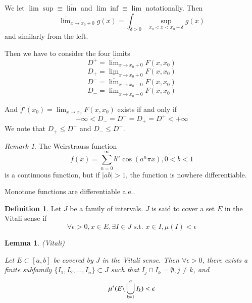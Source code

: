 \documentclass[11pt,a4paper]{report}
\newtheorem{lemma}[theorem]{Lemma}
\theoremstyle{plain}
\theoremstyle{definition}
\newtheorem*{defn}{Definition}
\theoremstyle{remark}
\newtheorem*{rem}{Remark}
\newcommand{\intersection}{\cap}
\newcommand{\Union}{\bigcup}
\newcommand{\abs}[1]{\left| #1 \right|}
\begin{document}
\renewcommand{\limsup}{\overline{\lim}}
\renewcommand{\liminf}{\underline{\lim}}

We let $\lim\sup \equiv \limsup$ and $\lim\inf \equiv \liminf$ notationally. Then
$$ \limsup_{x \to x_0 + 0} g(x) = \int_{\delta > 0} \sup_{x_0 < x < x_0 + \delta} g(x) $$
and similarly from the left.

Then we have to consider the four limits
\newcommand{\Dpu}{D^{+}}
\newcommand{\Dpl}{D_{+}}
\newcommand{\Dmu}{D^{-}}
\newcommand{\Dml}{D_{-}}
$$ \Dpu = \limsup_{x \to x_0 + 0} F(x, x_0) $$
$$ \Dpl = \liminf_{x \to x_0 + 0} F(x, x_0) $$
$$ \Dmu = \limsup_{x \to x_0 - 0} F(x, x_0) $$
$$ \Dml = \liminf_{x \to x_0 - 0} F(x, x_0) $$

And $f'(x_0) = \lim_{x \to x_0} F(x, x_0)$ exists if and only if 
$$-\infty < \Dml = \Dmu = \Dpl = \Dpu < +\infty$$
We note that $\Dpl \le \Dpu$ and $\Dml \le \Dmu$.

\begin{rem}
  The Weirstrauss function
    $$ f(x) = \sum_{n = 0}^\infty b^n \cos(a^n \pi x), 0 < b < 1 $$
  is a continuous function, but if $\abs{ab} > 1$, the function is nowhere differentiable.
\end{rem}

Monotone functions are differentiable a.e..

\begin{defn}
  Let $J$ be a family of intervals. $J$ is said to cover a set $E$ in the Vitali sense if
    $$ \forall \epsilon > 0, x \in E, \exists I \in J \text{ s.t. } x \in I, \mu(I) < \epsilon $$
\end{defn}

\begin{lemma}(Vitali)

    Let $E \subset [a, b]$ be covered by $J$ in the Vitali sense. Then $\forall \epsilon > 0$, there exists a finite subfamily  $\{ I_1, I_2, \dots, I_n \} \subset J $ such that $I_j \intersection I_k = \emptyset, j \ne k$, and
    $$ \mustar(E \backslash \Union_{k=1}^n I_k) < \epsilon $$
\end{lemma}
\end{document}
